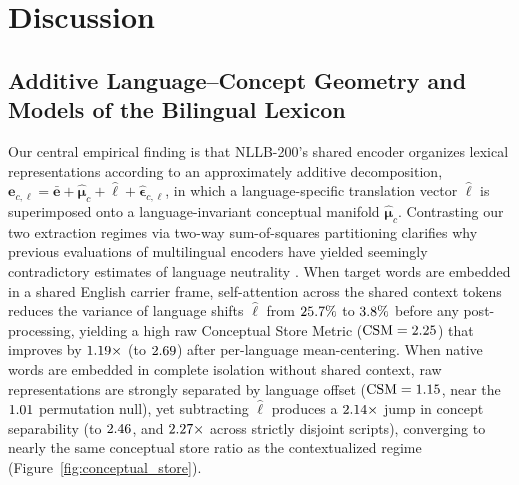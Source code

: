 \section{Discussion}
\label{sec:discussion}

\subsection{Additive Language--Concept Geometry and Models of the Bilingual Lexicon}

Our central empirical finding is that NLLB-200's shared encoder organizes lexical representations according to an approximately additive decomposition, $\mathbf{e}_{c,\ell} = \bar{\mathbf{e}} + \hat{\boldsymbol{\mu}}_c + \hat{\boldsymbol{\ell}} + \hat{\boldsymbol{\epsilon}}_{c,\ell}$, in which a language-specific translation vector $\hat{\boldsymbol{\ell}}$ is superimposed onto a language-invariant conceptual manifold $\hat{\boldsymbol{\mu}}_c$.
Contrasting our two extraction regimes via two-way sum-of-squares partitioning clarifies why previous evaluations of multilingual encoders have yielded seemingly contradictory estimates of language neutrality \citep{pires2019,conneau2020,chang2022}.
When target words are embedded in a shared English carrier frame, self-attention across the shared context tokens reduces the variance of language shifts $\hat{\boldsymbol{\ell}}$ from $25.7{}\%$ to $3.8{}\%$ before any post-processing, yielding a high raw Conceptual Store Metric ($\text{CSM} = 2.25{}$) that improves by $1.19{}\times$ (to $2.69{}$) after per-language mean-centering.
When native words are embedded in complete isolation without shared context, raw representations are strongly separated by language offset ($\text{CSM} = 1.15{}$, near the $1.01{}$ permutation null), yet subtracting $\hat{\boldsymbol{\ell}}$ produces a $2.14{}\times$ jump in concept separability (to $2.46{}$, and $2.27{}\times$ across strictly disjoint scripts), converging to nearly the same conceptual store ratio as the contextualized regime (Figure~\ref{fig:conceptual_store}).

